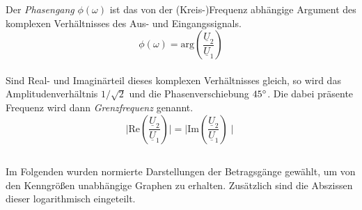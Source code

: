 \documentclass[a4paper, 12pt]{article}
\begin{document}
  Der \emph{Phasengang} $\phi(\omega)$ ist das von der (Kreis-)Frequenz abhängige Argument des komplexen Verhältnisses des Aus- und Eingangssignals.
  $$\phi(\omega) = \text{arg} \left( \frac{ \underline{U}_2 }{ \underline{U}_1 } \right)$$\\

  Sind Real- und Imaginärteil dieses komplexen Verhältnisses gleich, so wird das Amplitudenverhältnis $1/\sqrt{2}$ und die Phasenverschiebung $45 \degree$. Die dabei präsente Frequenz wird dann \emph{Grenzfrequenz} genannt.
  $$ \mid \text{Re}\left( \frac{ \underline{U}_2 }{ \underline{U}_1 } \right) \mid = \mid \text{Im}\left( \frac{ \underline{U}_2 }{ \underline{U}_1 } \right) \mid$$

\subsection{}
  Im Folgenden wurden normierte Darstellungen der Betragsgänge gewählt, um von den Kenngrößen unabhängige Graphen zu erhalten. Zusätzlich sind die Abszissen dieser logarithmisch eingeteilt.
\end{document}

